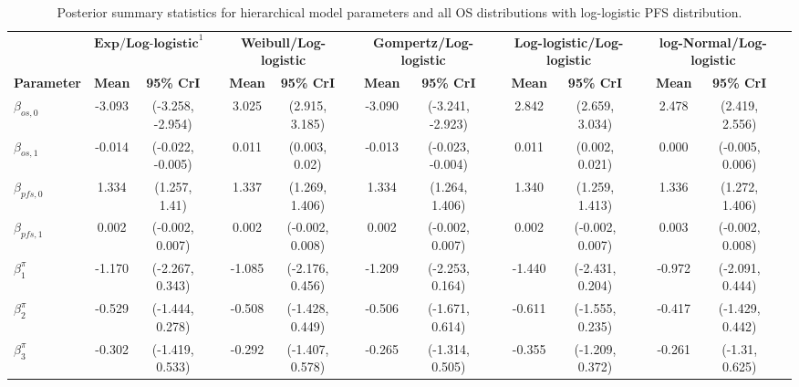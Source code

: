 \documentclass[AMA,STIX1COL]{WileyNJD-v2}
\begin{document}
\begin{landscape}
\begin{center}
\begin{table}[t]
\caption{Posterior summary statistics for hierarchical model parameters and all OS distributions with log-logistic PFS distribution. \label{tab:post_hier_pfs_llogistic}}
\centering
\begin{tabular}{l c c c c c c c c c c c c c c c}
\toprule
\multicolumn{1}{l}{} & \multicolumn{2}{c}{$\textbf{Exp/Log-logistic}^1$} & & \multicolumn{2}{c}{\textbf{Weibull/Log-logistic}} & & \multicolumn{2}{c}{\textbf{Gompertz/Log-logistic}} & & \multicolumn{2}{c}{\textbf{Log-logistic/Log-logistic}} & & \multicolumn{2}{c}{\textbf{log-Normal/Log-logistic}}\\
\cmidrule{2-3}\cmidrule{5-6}\cmidrule{8-9}\cmidrule{11-12}\cmidrule{14-15}
\textbf{Parameter} & \textbf{Mean} & \textbf{95\% CrI} & & \textbf{Mean} & \textbf{95\% CrI} & & \textbf{Mean} & \textbf{95\% CrI} & & \textbf{Mean} & \textbf{95\% CrI} & & \textbf{Mean} & \textbf{95\% CrI}\\
\midrule
$\beta_{os, 0}$ & -3.093 & (-3.258, -2.954) &  & 3.025 & (2.915, 3.185) &  & -3.090 & (-3.241, -2.923) &  & 2.842 & (2.659, 3.034) &  & 2.478 & (2.419, 2.556) & \\
$\beta_{os, 1}$ & -0.014 & (-0.022, -0.005) &  & 0.011 & (0.003, 0.02) &  & -0.013 & (-0.023, -0.004) &  & 0.011 & (0.002, 0.021) &  & 0.000 & (-0.005, 0.006) & \\
$\beta_{pfs, 0}$ & 1.334 & (1.257, 1.41) &  & 1.337 & (1.269, 1.406) &  & 1.334 & (1.264, 1.406) &  & 1.340 & (1.259, 1.413) &  & 1.336 & (1.272, 1.406) & \\
$\beta_{pfs, 1}$ & 0.002 & (-0.002, 0.007) &  & 0.002 & (-0.002, 0.008) &  & 0.002 & (-0.002, 0.007) &  & 0.002 & (-0.002, 0.007) &  & 0.003 & (-0.002, 0.008) & \\
$\beta^{\pi}_1$ & -1.170 & (-2.267, 0.343) &  & -1.085 & (-2.176, 0.456) &  & -1.209 & (-2.253, 0.164) &  & -1.440 & (-2.431, 0.204) &  & -0.972 & (-2.091, 0.444) & \\
$\beta^{\pi}_2$ & -0.529 & (-1.444, 0.278) &  & -0.508 & (-1.428, 0.449) &  & -0.506 & (-1.671, 0.614) &  & -0.611 & (-1.555, 0.235) &  & -0.417 & (-1.429, 0.442) & \\
$\beta^{\pi}_3$ & -0.302 & (-1.419, 0.533) &  & -0.292 & (-1.407, 0.578) &  & -0.265 & (-1.314, 0.505) &  & -0.355 & (-1.209, 0.372) &  & -0.261 & (-1.31, 0.625) & \\

\end{tabular}
\end{table}
\end{center}
\end{landscape}
\end{document}
